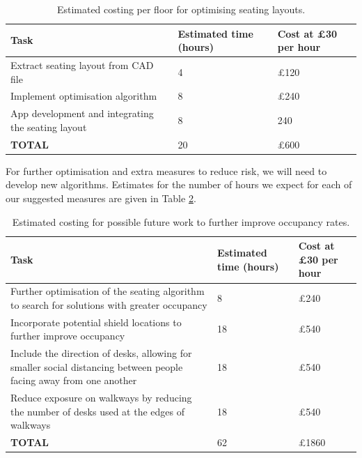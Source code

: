 \documentclass[11pt,a4paper]{article}
\begin{document}
\begin{table}[ht!]
\begin{center}
 \begin{tabularx}{\textwidth}{|X |l|l|}
 \hline
\textbf{Task} &\textbf{Estimated time (hours)} &\textbf{Cost at £30 per hour} \\
 \hline
Extract seating layout from CAD file & 4 & £120 \\
\hline
Implement optimisation algorithm  & 8 & £240 \\
\hline
App development and integrating the seating layout & 8 & 240 \\
\hline
\textbf{TOTAL}  & 20 & £600 \\
\hline
\end{tabularx}
\end{center}
\caption{Estimated costing per floor for optimising seating layouts.}
\label{tab:costing_perfloor}
\end{table}

For further optimisation and extra measures to reduce risk, we will need to develop new algorithms. Estimates for the number of hours we expect for each of our suggested measures are given in Table \ref{tab:costing_extras}.


\begin{table}[ht!]
\begin{center}
 \begin{tabularx}{\textwidth}{|X |l|l|}
 \hline
\textbf{Task} &\textbf{Estimated time (hours)} &\textbf{Cost at £30 per hour} \\
 \hline
Further optimisation of the seating algorithm to search for solutions with greater occupancy & 8 & £240 \\
\hline
Incorporate potential shield locations to further improve occupancy & 18 & £540 \\
\hline
Include the direction of desks, allowing for smaller social distancing between people facing away from one another & 18 & £540 \\
\hline
Reduce exposure on walkways by reducing the number of desks used at the edges of walkways  & 18 & £540 \\
\hline
\textbf{TOTAL}  & 62 & £1860 \\
\hline
\end{tabularx}
\end{center}
\caption{Estimated costing for possible future work to further improve occupancy rates.}
\label{tab:costing_extras}
\end{table}
\end{document}
